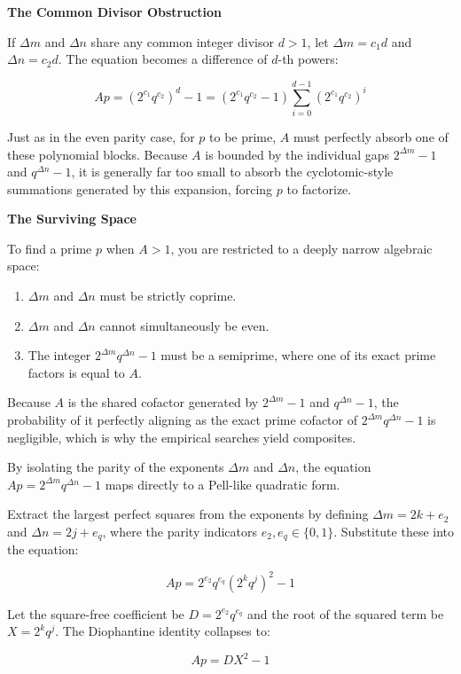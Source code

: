\documentclass{article}
\begin{document}
\textbf{The Common Divisor Obstruction}

If $\Delta m$ and $\Delta n$ share any common integer divisor $d > 1$, let $\Delta m = c_1 d$ and $\Delta n = c_2 d$. The equation becomes a difference of $d$-th powers:

$$Ap = (2^{c_1} q^{c_2})^d - 1 = (2^{c_1} q^{c_2} - 1) \sum_{i=0}^{d-1} (2^{c_1} q^{c_2})^i$$

Just as in the even parity case, for $p$ to be prime, $A$ must perfectly absorb one of these polynomial blocks. Because $A$ is bounded by the individual gaps $2^{\Delta m}-1$ and $q^{\Delta n}-1$, it is generally far too small to absorb the cyclotomic-style summations generated by this expansion, forcing $p$ to factorize.

\textbf{The Surviving Space}

To find a prime $p$ when $A > 1$, you are restricted to a deeply narrow algebraic space:

\begin{enumerate}
    \item $\Delta m$ and $\Delta n$ must be strictly coprime.
    \item $\Delta m$ and $\Delta n$ cannot simultaneously be even.
    \item The integer $2^{\Delta m} q^{\Delta n} - 1$ must be a semiprime, where one of its exact prime factors is equal to $A$.
\end{enumerate}

Because $A$ is the shared cofactor generated by $2^{\Delta m}-1$ and $q^{\Delta n}-1$, the probability of it perfectly aligning as the exact prime cofactor of $2^{\Delta m} q^{\Delta n} - 1$ is negligible, which is why the empirical searches yield composites.

By isolating the parity of the exponents $\Delta m$ and $\Delta n$, the equation $Ap = 2^{\Delta m} q^{\Delta n} - 1$ maps directly to a Pell-like quadratic form.

Extract the largest perfect squares from the exponents by defining $\Delta m = 2k + e_2$ and $\Delta n = 2j + e_q$, where the parity indicators $e_2, e_q \in \{0, 1\}$.
Substitute these into the equation:

$$Ap = 2^{e_2} q^{e_q} (2^k q^j)^2 - 1$$

Let the square-free coefficient be $D = 2^{e_2} q^{e_q}$ and the root of the squared term be $X = 2^k q^j$. The Diophantine identity collapses to:

$$Ap = DX^2 - 1$$
\end{document}
